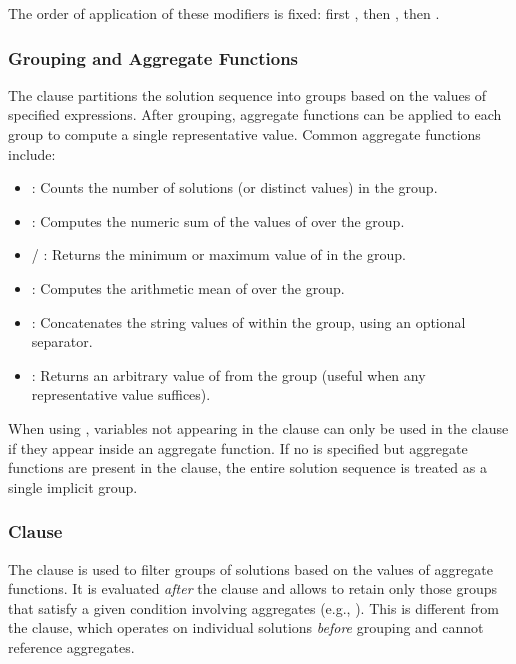 The order of application of these modifiers is fixed: first , then , then .

\subsubsection{Grouping and Aggregate Functions}
The  clause partitions the solution sequence into groups based on the values of specified expressions. After grouping, aggregate functions can be applied to each group to compute a single representative value. Common aggregate functions include:

\begin{itemize}
    \item {}: Counts the number of solutions (or distinct values) in the group.
    \item {}: Computes the numeric sum of the values of  over the group.
    \item {} / : Returns the minimum or maximum value of  in the group.
    \item {}: Computes the arithmetic mean of  over the group.
    \item {}: Concatenates the string values of  within the group, using an optional separator.
    \item {}: Returns an arbitrary value of  from the group (useful when any representative value suffices).
\end{itemize}

When using , variables not appearing in the  clause can only be used in the  clause if they appear inside an aggregate function. If no  is specified but aggregate functions are present in the  clause, the entire solution sequence is treated as a single implicit group.

\subsubsection{ Clause}
The  clause is used to filter groups of solutions based on the values of aggregate functions. It is evaluated \emph{after} the  clause and allows to retain only those groups that satisfy a given condition involving aggregates (e.g., ). This is different from the  clause, which operates on individual solutions \emph{before} grouping and cannot reference aggregates.


